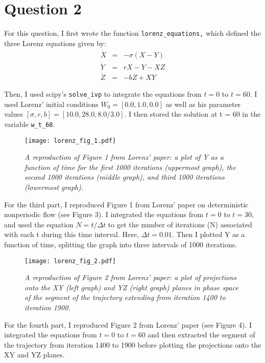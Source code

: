 \documentclass{article}
\begin{document}
\section{Question 2}

For this question, I first wrote the function \texttt{lorenz\_equations,} which defined the three Lorenz equations given by: 
\begin{eqnarray}
\dot X &=& -\sigma(X-Y)\\
\dot Y &=& rX -Y - XZ\\
\dot Z &=& -bZ + XY
\end{eqnarray}

Then, I used scipy's \texttt{solve\_ivp} to integrate the equations from $t = 0$ to $t = 60$. I used Lorenz' initial conditions $W_{0} = [0.0, 1.0, 0.0]$ as well as his parameter values $[\sigma, r, b] = [10.0, 28.0, 8.0/3.0]$. I then stored the solution at t = 60 in the variable \texttt{w\_t\_60}.

\begin{figure}[h]
\caption{\textit{A reproduction of Figure 1 from Lorenz' paper: a plot of Y as a function of time for the first 1000 iterations (uppermost graph), the second 1000 iterations (middle graph), and third 1000 iterations (lowermost graph).}}
\centering
\texttt{[image: lorenz\_fig\_1.pdf]}
\end{figure}

For the third part, I reproduced Figure 1 from Lorenz' paper on deterministic nonperiodic flow (see Figure 3). I integrated the equations from $t = 0$ to $t = 30$, and used the equation $N = t/\Delta t$ to get the number of iterations (N) associated with each t during this time interval. Here, $\Delta t = 0.01$. Then I plotted Y as a function of time, splitting the graph into three intervals of 1000 iterations.

\begin{figure}[h]
\caption{\textit{A reproduction of Figure 2 from Lorenz' paper: a plot of projections onto the XY (left graph) and YZ (right graph) planes in phase space of the segment of the trajectory extending from iteration 1400 to iteration 1900.}}
\centering
\texttt{[image: lorenz\_fig\_2.pdf]}
\end{figure}

For the fourth part, I reproduced Figure 2 from Lorenz' paper (see Figure 4). I integrated the equations from $t = 0$ to $t = 60$ and then extracted the segment of the trajectory from iteration 1400 to 1900 before plotting the projections onto the XY and YZ planes.
\end{document}
